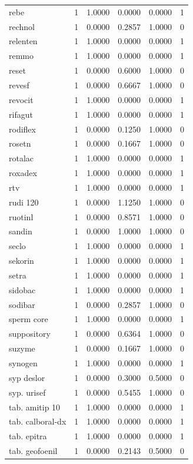 \begin{longtable}{p{3.0cm}rrrrr}
rebe & 1 & 1.0000 & 0.0000 & 0.0000 & 1 \\
rechnol & 1 & 0.0000 & 0.2857 & 1.0000 & 0 \\
relenten & 1 & 1.0000 & 0.0000 & 0.0000 & 1 \\
remmo & 1 & 1.0000 & 0.0000 & 0.0000 & 1 \\
reset & 1 & 0.0000 & 0.6000 & 1.0000 & 0 \\
revesf & 1 & 0.0000 & 0.6667 & 1.0000 & 0 \\
revocit & 1 & 1.0000 & 0.0000 & 0.0000 & 1 \\
rifagut & 1 & 1.0000 & 0.0000 & 0.0000 & 1 \\
rodiflex & 1 & 0.0000 & 0.1250 & 1.0000 & 0 \\
rosetn & 1 & 0.0000 & 0.1667 & 1.0000 & 0 \\
rotalac & 1 & 1.0000 & 0.0000 & 0.0000 & 1 \\
roxadex & 1 & 1.0000 & 0.0000 & 0.0000 & 1 \\
rtv & 1 & 1.0000 & 0.0000 & 0.0000 & 1 \\
rudi 120 & 1 & 0.0000 & 1.1250 & 1.0000 & 0 \\
ruotinl & 1 & 0.0000 & 0.8571 & 1.0000 & 0 \\
sandin & 1 & 0.0000 & 1.0000 & 1.0000 & 0 \\
seclo & 1 & 1.0000 & 0.0000 & 0.0000 & 1 \\
sekorin & 1 & 1.0000 & 0.0000 & 0.0000 & 1 \\
setra & 1 & 1.0000 & 0.0000 & 0.0000 & 1 \\
sidobac & 1 & 1.0000 & 0.0000 & 0.0000 & 1 \\
sodibar & 1 & 0.0000 & 0.2857 & 1.0000 & 0 \\
sperm core & 1 & 1.0000 & 0.0000 & 0.0000 & 1 \\
suppository & 1 & 0.0000 & 0.6364 & 1.0000 & 0 \\
suzyme & 1 & 0.0000 & 0.1667 & 1.0000 & 0 \\
synogen & 1 & 1.0000 & 0.0000 & 0.0000 & 1 \\
syp deslor & 1 & 0.0000 & 0.3000 & 0.5000 & 0 \\
syp. urisef & 1 & 0.0000 & 0.5455 & 1.0000 & 0 \\
tab. amitip 10 & 1 & 1.0000 & 0.0000 & 0.0000 & 1 \\
tab. calboral-dx & 1 & 1.0000 & 0.0000 & 0.0000 & 1 \\
tab. epitra & 1 & 1.0000 & 0.0000 & 0.0000 & 1 \\
tab. geofoenil & 1 & 0.0000 & 0.2143 & 0.5000 & 0 \\

\end{longtable}
